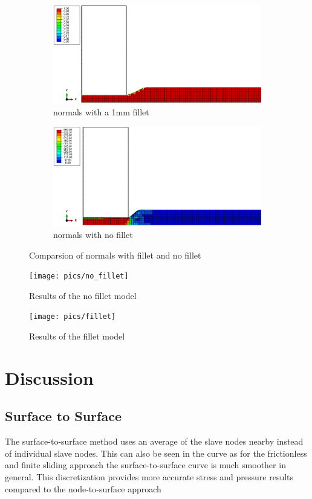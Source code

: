 \documentclass[12pt]{article}
\begin{document}
\begin{figure}[!htb]
  \centering
  \begin{subfigure}{.5\textwidth}
    \centering
    \includegraphics[trim={0cm 0cm 0cm 0cm},clip,width=0.4\linewidth]{pics/eulerian}
    \caption{normals with a 1mm fillet}
  \end{subfigure}%
  \begin{subfigure}{.5\textwidth}
    \centering
    \includegraphics[trim={0cm 0cm 0cm 0cm},clip,width=0.4\linewidth]{pics/eulerian_friction}
    \caption{normals with no fillet}
   \end{subfigure}
  \caption{Comparsion of normals with fillet and no fillet}
  \label{fig:1}
\end{figure}

\begin{figure}[!htb]
  \centering
  \texttt{[image: pics/no\_fillet]}
  \caption{Results of the no fillet model}
  \label{fig:3}
\end{figure}

\begin{figure}[!htb]
  \centering
  \texttt{[image: pics/fillet]}
  \caption{Results of the fillet model}
  \label{fig:4}
\end{figure}

\newpage

\section{Discussion}

\subsection{Surface to Surface}
The surface-to-surface method uses an average of the slave nodes nearby instead of individual slave nodes. This can also be seen in the curve as for the frictionless and finite sliding approach the surface-to-surface curve is much smoother in general. This discretization provides more accurate stress and pressure results compared to the node-to-surface approach
\end{document}
